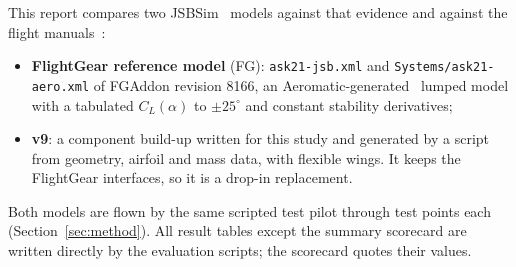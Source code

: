 \documentclass[10pt,a4paper,twocolumn]{article}
\newcommand{\vnine}{v9}
\newcommand{\FG}{FG}
\begin{document}
This report compares two JSBSim~\cite{jsbsim} models against that evidence and against the flight manuals~\cite{fm04b,fm23}:
\begin{itemize}
\item \textbf{FlightGear reference model} (\FG): \texttt{ask21-jsb.xml} and \texttt{Systems/ask21-aero.xml} of FGAddon revision 8166,
an Aeromatic-generated~\cite{aeromatic} lumped model with a tabulated $C_L(\alpha)$ to $\pm25^\circ$ and constant stability derivatives;
\item \textbf{\vnine{}}: a component build-up written for this study and generated by a script from geometry, airfoil and mass data,
with flexible wings. It keeps the FlightGear interfaces, so it is a drop-in replacement.
\end{itemize}
Both models are flown by the same scripted test pilot through \NnTests{} test points each (Section~\ref{sec:method}). All result tables except the
summary scorecard are written directly by the evaluation scripts; the scorecard quotes their values.

\end{document}

